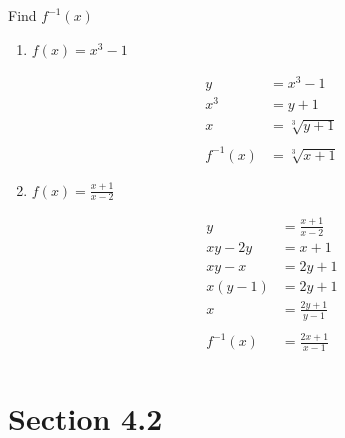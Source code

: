 \documentclass{exam}
\begin{document}
  Find $f^{-1}(x)$

  \begin{enumerate}

    \item $f(x) = x^3 - 1$ 
      \begin{solution}
        \begin{align*}
          y   &= x^3 - 1 \\
          x^3 &= y + 1 \\
          x   &= \sqrt[3]{y + 1} \\
          \\
          f^{-1}(x) &= \sqrt[3]{x + 1}
        \end{align*}
      \end{solution}

    \item $f(x) = \frac{x + 1}{x - 2}$
      \begin{solution}
        \begin{align*}
          y        &= \frac{x + 1}{x - 2} \\
          xy - 2y  &= x + 1 \\
          xy - x   &= 2y + 1 \\
          x(y - 1) &= 2y + 1 \\
          x        &= \frac{2y + 1}{y - 1} \\
          \\
          f^{-1}(x) &= \frac{2x + 1}{x - 1} \\
        \end{align*}
      \end{solution}

  \end{enumerate}

  \ifprintanswers
    \section{Section 4.2}
\end{document}
